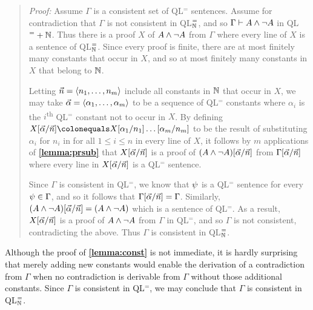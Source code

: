 \begin{quote} 
  \textit{Proof:} Assume $\Gamma$ is a consistent set of QL$^=$ sentences.
  Assume for contradiction that $\Gamma$ is not consistent in QL$^=_{\mathbb{N}}$, and so $\Gamma\vdash A\wedge\neg A$ in QL$^=+{\mathbb{N}}$.
  Thus there is a proof $X$ of $A\wedge\neg A$ from $\Gamma$ where every line of $X$ is a sentence of QL$^=_{\mathbb{N}}$.
  Since every proof is finite, there are at most finitely many constants that occur in $X$, and so at most finitely many constants in $X$ that belong to $\mathbb{N}$.

  Letting $\vec{n}=\langle n_1,\ldots,n_m\rangle$ include all constants in $\mathbb{N}$ that occur in $X$, we may take $\vec{\alpha}=\langle\alpha_1,\ldots,\alpha_m\rangle$ to be a sequence of QL$^=$ constants where $\alpha_i$ is the $i$\textsuperscript{th} QL$^=$ constant not to occur in $X$.
  By defining $X\unisub{\vec{\alpha}}{\vec{n}}\colonequals X\unisub{\alpha_1}{n_1}\ldots\unisub{\alpha_m}{n_m}$ to be the result of substituting $\alpha_i$ for $n_i$ in for all $1\leq i\leq n$ in every line of $X$, it follows by $m$ applications of \textbf{\ref{lemma:prsub}} that $X[\vec{\alpha}/\vec{n}]$ is a proof of $(A\wedge\neg A)[\vec{\alpha}/\vec{n}]$ from $\Gamma[\vec{\alpha}/\vec{n}]$ where every line in $X[\vec{\alpha}/\vec{n}]$ is a QL$^=$ sentence.

  Since $\Gamma$ is consistent in QL$^=$, we know that $\psi$ is a QL$^=$ sentence for every $\psi\in\Gamma$, and so it follows that $\Gamma[\vec{\alpha}/\vec{n}]=\Gamma$.
  Similarly, $(A\wedge\neg A)[\vec{\alpha}/\vec{n}]=(A\wedge\neg A)$ which is a sentence of QL$^=$. 
  As a result, $X[\vec{\alpha}/\vec{n}]$ is a proof of $A\wedge\neg A$ from $\Gamma$ in QL$^=$, and so $\Gamma$ is not consistent, contradicting the above.
  Thus $\Gamma$ is consistent in QL$^=_{\mathbb{N}}$.
\end{quote}

Although the proof of \textbf{\ref{lemma:const}} is not immediate, it is hardly surprising that merely adding new constants would enable the derivation of a contradiction from $\Gamma$ when no contradiction is derivable from $\Gamma$ without those additional constants.
Since $\Gamma$ is consistent in QL$^=$, we may conclude that $\Gamma$ is consistent in QL$^=_{\mathbb{N}}$.





